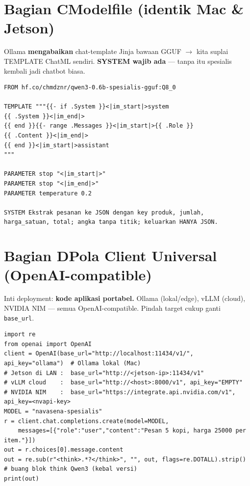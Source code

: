 \documentclass[11pt,a4paper]{article}
\begin{document}
\section*{\color{nvgreen}Bagian C\quad Modelfile (identik Mac \& Jetson)}
\begin{warn}Ollama \textbf{mengabaikan} chat-template Jinja bawaan GGUF $\to$ kita suplai TEMPLATE ChatML sendiri. \textbf{SYSTEM wajib ada} --- tanpa itu spesialis kembali jadi chatbot biasa.\end{warn}
\begin{lstlisting}[style=nvfile]
FROM hf.co/chmdznr/qwen3-0.6b-spesialis-gguf:Q8_0

TEMPLATE """{{- if .System }}<|im_start|>system
{{ .System }}<|im_end|>
{{ end }}{{- range .Messages }}<|im_start|>{{ .Role }}
{{ .Content }}<|im_end|>
{{ end }}<|im_start|>assistant
"""

PARAMETER stop "<|im_start|>"
PARAMETER stop "<|im_end|>"
PARAMETER temperature 0.2

SYSTEM Ekstrak pesanan ke JSON dengan key produk, jumlah, harga_satuan, total; angka tanpa titik; keluarkan HANYA JSON.
\end{lstlisting}

\section*{\color{nvgreen}Bagian D\quad Pola Client Universal (OpenAI-compatible)}
Inti deployment: \textbf{kode aplikasi portabel.} Ollama (lokal/edge), vLLM (cloud), NVIDIA NIM --- semua OpenAI-compatible. Pindah target cukup ganti \texttt{base\_url}.
\begin{lstlisting}[style=nvpy]
import re
from openai import OpenAI
client = OpenAI(base_url="http://localhost:11434/v1/", api_key="ollama")  # Ollama lokal (Mac)
# Jetson di LAN :  base_url="http://<jetson-ip>:11434/v1"
# vLLM cloud    :  base_url="http://<host>:8000/v1", api_key="EMPTY"
# NVIDIA NIM    :  base_url="https://integrate.api.nvidia.com/v1", api_key=<nvapi-key>
MODEL = "navasena-spesialis"
r = client.chat.completions.create(model=MODEL,
    messages=[{"role":"user","content":"Pesan 5 kopi, harga 25000 per item."}])
out = r.choices[0].message.content
out = re.sub(r"<think>.*?</think>", "", out, flags=re.DOTALL).strip()  # buang blok think Qwen3 (kebal versi)
print(out)
\end{lstlisting}
\end{document}
